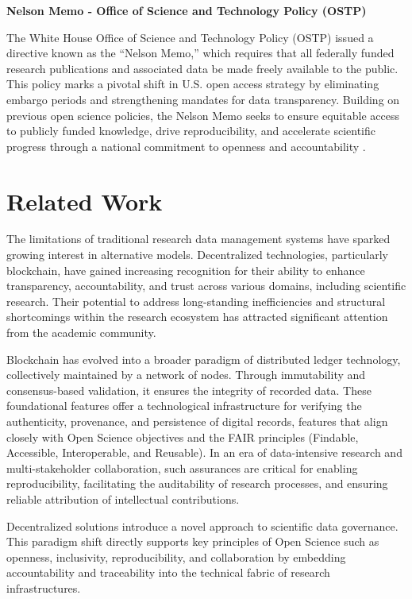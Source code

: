 \documentclass[final]{rc-book-2.14}
\begin{document}
\textbf{Nelson Memo - Office of Science and Technology Policy (OSTP)}

The White House Office of Science and Technology Policy (OSTP) issued a directive known as the “Nelson Memo,” which requires that all federally funded research publications and associated data be made freely available to the public. This policy marks a pivotal shift in U.S. open access strategy by eliminating embargo periods and strengthening mandates for data transparency. Building on previous open science policies, the Nelson Memo seeks to ensure equitable access to publicly funded knowledge, drive reproducibility, and accelerate scientific progress through a national commitment to openness and accountability \cite{nelson_2023}.

\section{Related Work}
\label{chp:review:sec:rel_work}

The limitations of traditional research data management systems have sparked growing interest in alternative models. Decentralized technologies, particularly blockchain, have gained increasing recognition for their ability to enhance transparency, accountability, and trust across various domains, including scientific research. Their potential to address long-standing inefficiencies and structural shortcomings within the research ecosystem has attracted significant attention from the academic community.

Blockchain has evolved into a broader paradigm of distributed ledger technology, collectively maintained by a network of nodes. Through immutability and consensus-based validation, it ensures the integrity of recorded data. These foundational features offer a technological infrastructure for verifying the authenticity, provenance, and persistence of digital records, features that align closely with Open Science objectives and the FAIR principles (Findable, Accessible, Interoperable, and Reusable). In an era of data-intensive research and multi-stakeholder collaboration, such assurances are critical for enabling reproducibility, facilitating the auditability of research processes, and ensuring reliable attribution of intellectual contributions.

Decentralized solutions introduce a novel approach to scientific data governance. This paradigm shift directly supports key principles of Open Science such as openness, inclusivity, reproducibility, and collaboration by embedding accountability and traceability into the technical fabric of research infrastructures.
\end{document}
